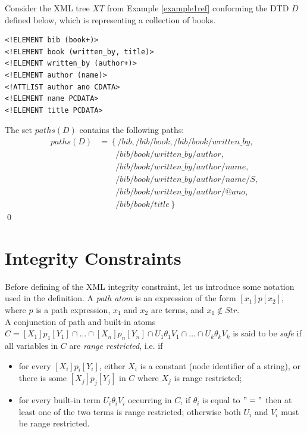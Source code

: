 \begin{example}\label{pathExample}
Consider the XML tree $XT$ from Example \ref{example1ref} conforming the DTD $D$ defined below, which is representing a collection of books.
\begin{verbatim}
<!ELEMENT bib (book+)>
<!ELEMENT book (written_by, title)>
<!ELEMENT written_by (author+)>
<!ELEMENT author (name)>
<!ATTLIST author ano CDATA>
<!ELEMENT name PCDATA>
<!ELEMENT title PCDATA>
\end{verbatim}

The set $paths(D)$ contains the following paths:
\begin{align}
paths(D) &= \left\{/bib, /bib/book, /bib/book/written\_by,\right.\nonumber\\
&\qquad \left. /bib/book/written\_by/author, \right.\nonumber\\
&\qquad \left. /bib/book/written\_by/author/name, \right.\nonumber\\
&\qquad \left. /bib/book/written\_by/author/name/S, \right.\nonumber\\
&\qquad \left. /bib/book/written\_by/author/@ano, \right.\nonumber\\
&\qquad \left. /bib/book/title\nonumber\right\}
\end{align}\qed
\end{example}

\section{Integrity Constraints}

Before defining of the XML integrity constraint, let us introduce some notation used in the definition. A \emph{path atom} is an expression of the form $[x_1]p[x_2]$, where $p$ is a path expression, $x_1$ and $x_2$ are terms, and $x_1 \not \in Str$.\\
A conjunction of path and built-in atoms $C = [X_1]p_1[Y_1] \cap \dots \cap [X_n]p_n[Y_n] \cap U_1\theta_1 V_1 \cap \dots \cap U_k \theta_k V_k$ is said to be \emph{safe} if all variables in $C$ are \emph{range restricted}, i.e. if
\begin{itemize}
 	\item for every $[X_i]p_i[Y_i]$, either $X_i$ is a constant (node identifier of a string), or there is some $[X_j]p_j[Y_j]$ in $C$ where $X_j$ is range restricted;
    \item for every built-in term $U_i\theta_i V_i$ occurring in $C$, if $\theta_i$ is equal to $"="$ then at least one of the two terms is range restricted; otherwise both $U_i$ and $V_i$ must be range restricted.
 \end{itemize}

